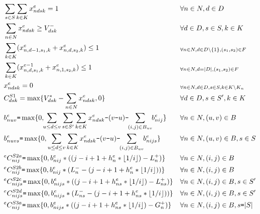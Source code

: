 \documentclass[cic,tc, twoside]{iiufrgs}
\begin{document}
\begin{samepage}
\begin{align}
& \sum_{s \in S} \sum_{k \in K} x^e_{ndsk} = 1    && \forall n \in N, d \in D \label{eH1} \\
& \sum_{n \in N} x^e_{ndsk} \geq V^-_{dsk}   && \forall d \in D, s \in S, k \in K \label{eH2} \\
& \sum_{k \in K} (x^e_{n,d-1,s_1,k} + x^e_{n,d,s_2,k}) \leq 1 && _{\forall n \in N, d \in D\setminus \{1\}, (s_1,s_2) \in F} \label{eH3a} \\
& \sum_{k \in K} (x^{e-1}_{n,d,s_1,k} + x^e_{n,1,s_2,k}) \leq 1 && _{\forall n \in N, d = |D|, (s_1,s_2) \in F} \label{eH3b} \\
& x^e_{ndsk} = 0   && _{\forall n \in N, d \in D, s \in S, k \in K\setminus K_n} \label{eH4} \\
& C^{S1}_{dsk} = \max\{ V^*_{dsk} - \sum_{n \in N} x^e_{ndsk}, 0\} && \forall d \in D, s \in S', k \in K \label{eS1} \\
& b^e_{nuv} \texttt{=} \max \{0, \hspace{-1mm}\sum_{u \leq d \leq v} \sum_{s \in S'} \sum_{k \in K} x^e_{ndsk} \texttt{-} (v \texttt{-}u) \texttt{-}\hspace{-1mm} \sum_{(i,j) \in B_{uv}}\hspace{-1mm} b^e_{nij}\} && \forall n \in N, (u,v) \in B \label{eS2aux1} \\
& b^e_{nuvs} \texttt{=} \max \{0, \sum_{u \leq d \leq v} \sum_{k \in K} x^e_{ndsk} \texttt{-} (v \texttt{-}u) \texttt{-} \hspace{-1mm}\sum_{(i,j) \in B_{uv}} \hspace{-1mm} b^e_{nijs}\} && \forall n \in N, (u,v) \in B, s \in S \label{eS2aux2} \\
& ^eC^{S2a}_{nij} \texttt{=}  \max\{0, b^e_{nij} * ((j - i +1 + h^e_{n}*\lfloor 1/i \rfloor) - L^+_{n})\} && \forall n \in N, (i,j) \in B \label{eS2a} \\
& ^eC^{S2b}_{nij} \texttt{=}  \max\{0, b^e_{nij} * (L^-_{n} - (j - i +1  + h^e_{n}*\lfloor 1/i \rfloor))\} && \forall n \in N, (i,j) \in B \label{eS2b} \\
& ^eC^{S2c}_{nijs} \texttt{=}  \max\{0, b^e_{nijs} * ((j - i +1  + h^e_{ns}*\lfloor 1/i \rfloor) - L^+_{ns})\} && \forall n \in N, (i,j) \in B, s \in S'\label{eS2c} \\
& ^eC^{S2d}_{nijs} \texttt{=}  \max\{0, b^e_{nijs} * (L^-_{ns} - (j - i +1 + h^e_{ns}*\lfloor 1/i \rfloor))\} && \forall n \in N, (i,j) \in B, s \in S' \label{eS2d} \\
& ^eC^{S3a}_{nij} \texttt{=}  \max\{0, b^e_{nijs} * ((j - i +1  + h^e_{ns}*\lfloor 1/i \rfloor) - G^+_{n})\} && \forall n \in N, (i,j) \in B, s \texttt{=} |S|\label{eS3a} \\

\end{align}
\end{samepage}
\end{document}
